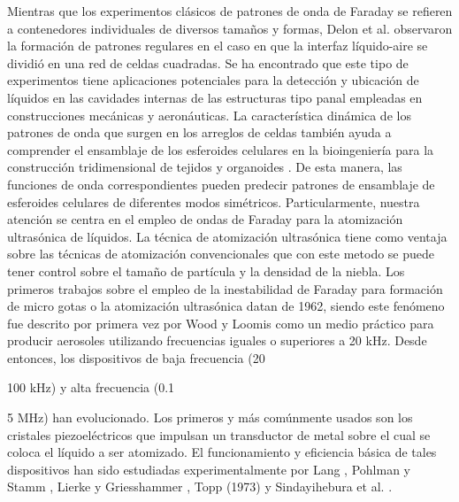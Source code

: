 Mientras que los experimentos clásicos de patrones de onda de Faraday se refieren a contenedores individuales de diversos tamaños y formas, Delon et al. \cite{Delon2010} observaron la formación de patrones regulares en el caso en que la interfaz líquido-aire se dividió en una red de celdas cuadradas. Se ha encontrado que este tipo de experimentos tiene aplicaciones potenciales para la detección y ubicación de líquidos en las  cavidades internas de las estructuras tipo panal empleadas en construcciones mecánicas y aeronáuticas. La característica dinámica de los patrones de onda que surgen en los arreglos de celdas también ayuda a comprender el ensamblaje de los esferoides celulares en la bioingeniería para la construcción tridimensional de tejidos y organoides \cite{Chen2015}. De esta manera, las funciones de onda correspondientes pueden predecir patrones de ensamblaje de esferoides celulares de diferentes modos simétricos. Particularmente, nuestra atención se centra en el empleo de ondas de Faraday para la atomización ultrasónica de líquidos. La técnica de atomización ultrasónica tiene como ventaja sobre las técnicas de atomización convencionales que con este metodo se puede tener control sobre el tamaño de partícula y la densidad de la niebla. Los primeros trabajos sobre el empleo de la inestabilidad de Faraday para formación de micro gotas o la atomización ultrasónica datan de 1962, siendo este fenómeno fue descrito por primera vez por Wood y Loomis \cite{Wood1927} como un medio práctico para producir aerosoles utilizando frecuencias iguales o superiores a 20 kHz. Desde entonces, los dispositivos de baja frecuencia (20 {100 kHz) y alta frecuencia (0.1 {5 MHz) han evolucionado. Los primeros y más comúnmente usados son los cristales piezoeléctricos que impulsan un transductor de metal sobre el cual se coloca el líquido a ser atomizado. El funcionamiento y eficiencia básica de tales dispositivos han sido estudiadas experimentalmente por Lang \cite{Lano1962}, Pohlman y Stamm \cite{Pohlman1965}, Lierke y Griesshammer \cite{Lierke1967}, Topp \cite{Topp1973} (1973) y Sindayihebura et al. \cite{Sindayihebura1997}.\medskip 

}}
